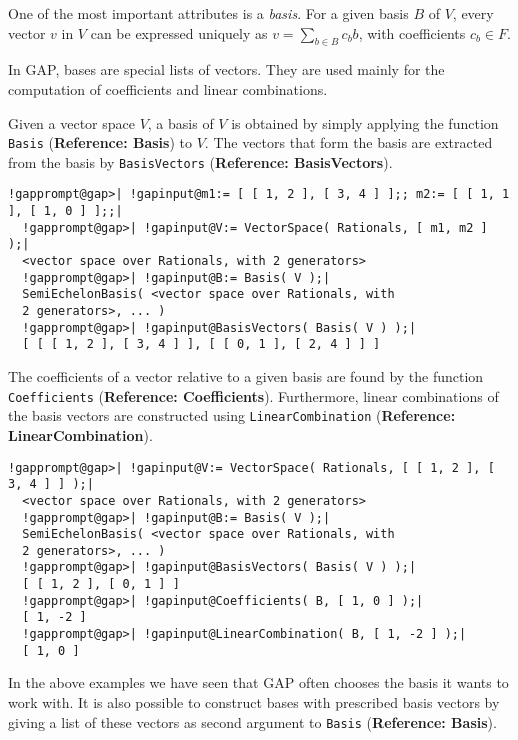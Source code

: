 \documentclass[a4paper,11pt]{report}
\begin{document}
{{ One of the most important attributes is a \emph{basis}. For a given basis $B$ of $V$, every vector $v$ in $V$ can be expressed uniquely as $v = \sum_{b \in B} c_b b$, with coefficients $c_b \in F$. 

 In \textsf{GAP}, bases are special lists of vectors. They are used mainly for the computation
of coefficients and linear combinations. 

 Given a vector space $V$, a basis of $V$ is obtained by simply applying the function \texttt{Basis} (\textbf{Reference: Basis}) to $V$. The vectors that form the basis are extracted from the basis by \texttt{BasisVectors} (\textbf{Reference: BasisVectors}). 

 
\begin{Verbatim}[commandchars=!@|,fontsize=\small,frame=single,label=Example]
  !gapprompt@gap>| !gapinput@m1:= [ [ 1, 2 ], [ 3, 4 ] ];; m2:= [ [ 1, 1 ], [ 1, 0 ] ];;|
  !gapprompt@gap>| !gapinput@V:= VectorSpace( Rationals, [ m1, m2 ] );|
  <vector space over Rationals, with 2 generators>
  !gapprompt@gap>| !gapinput@B:= Basis( V );|
  SemiEchelonBasis( <vector space over Rationals, with 
  2 generators>, ... )
  !gapprompt@gap>| !gapinput@BasisVectors( Basis( V ) );|
  [ [ [ 1, 2 ], [ 3, 4 ] ], [ [ 0, 1 ], [ 2, 4 ] ] ]
\end{Verbatim}
 

 The coefficients of a vector relative to a given basis are found by the
function \texttt{Coefficients} (\textbf{Reference: Coefficients}). Furthermore, linear combinations of the basis vectors are constructed using \texttt{LinearCombination} (\textbf{Reference: LinearCombination}). 

 
\begin{Verbatim}[commandchars=!@|,fontsize=\small,frame=single,label=Example]
  !gapprompt@gap>| !gapinput@V:= VectorSpace( Rationals, [ [ 1, 2 ], [ 3, 4 ] ] );|
  <vector space over Rationals, with 2 generators>
  !gapprompt@gap>| !gapinput@B:= Basis( V );|
  SemiEchelonBasis( <vector space over Rationals, with 
  2 generators>, ... )
  !gapprompt@gap>| !gapinput@BasisVectors( Basis( V ) );|
  [ [ 1, 2 ], [ 0, 1 ] ]
  !gapprompt@gap>| !gapinput@Coefficients( B, [ 1, 0 ] );|
  [ 1, -2 ]
  !gapprompt@gap>| !gapinput@LinearCombination( B, [ 1, -2 ] );|
  [ 1, 0 ]
\end{Verbatim}
 

 In the above examples we have seen that \textsf{GAP} often chooses the basis it wants to work with. It is also possible to
construct bases with prescribed basis vectors by giving a list of these
vectors as second argument to \texttt{Basis} (\textbf{Reference: Basis}). 

}}
\end{document}
